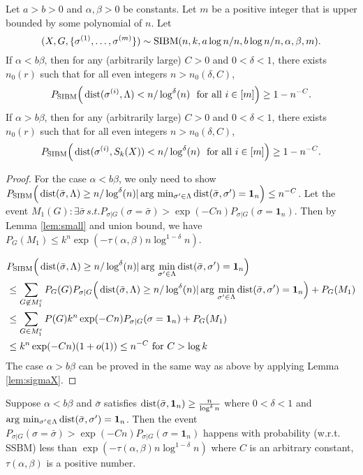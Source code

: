\documentclass{article}
\begin{document}
\begin{proposition} \label{prop:1}
Let $a>b>0$ and $\alpha,\beta>0$ be constants. Let $m$ be a positive integer that is upper bounded by some polynomial of $n$.
Let 
$$
(X,G,\{\sigma^{(1)},\dots,\sigma^{(m)}\})\sim \operatorname{SIBM}(n,k, a\log n/n, b\log n/n, \alpha,\beta, m) .
$$
If $\alpha < b\beta$, then for any (arbitrarily large) $C>0$ and $0<\delta<1$, there exists $n_0(r)$ such that for all even integers $n>n_0(\delta, C)$,
$$
P_{\operatorname{SIBM}} \Big(\operatorname{dist}(\sigma^{(i)}, \Lambda)< n/\log^{\delta}(n)
\text{~~for all~} i\in[m] \Big) \ge 1- n^{-C} .
$$
If $\alpha > b\beta$, then for any (arbitrarily large) $C>0$ and $0<\delta<1$, there exists $n_0(r)$ such that for all even integers $n>n_0(\delta, C)$,
$$
P_{\operatorname{SIBM}} \Big(\operatorname{dist}(\sigma^{(i)}, S_k(X)) < n/\log^{\delta}(n)
\text{~~for all~} i\in[m] \Big) \ge 1- n^{-C} .
$$
\end{proposition}
\begin{proof}
For the case $\alpha < b \beta$, we only need to show $P_{\operatorname{SIBM}} \Big(\operatorname{dist}(\bar{\sigma}, \Lambda)\geq n/\log^{\delta}(n)
| \arg\,\min_{\sigma'\in \Lambda} \operatorname{dist}(\bar{\sigma}, \sigma') = \mathbf{1}_n
 \Big) \leq n^{-C}$.
 Let the event $M_1(G): \exists \bar{\sigma} \,s.t. P_{\sigma | G}(\sigma = \bar{\sigma} ) > \exp(-Cn) P_{\sigma | G}(\sigma = \mathbf{1}_n)$.
Then by Lemma \ref{lem:small} and union bound, we have $P_{G}(M_1) \leq k^n\exp(-\tau(\alpha, \beta )n \log^{1-\delta} n )$.
 
\begin{align*}
&P_{\operatorname{SIBM}} \Big(\operatorname{dist}(\bar{\sigma}, \Lambda)\geq n/\log^{\delta}(n)
| \arg\,\min_{\sigma'\in \Lambda} \operatorname{dist}(\bar{\sigma}, \sigma') = \mathbf{1}_n \Big) \\
&\leq
\sum_{G \not\in M_1^c}P_G(G) P_{\sigma | G}\Big(\operatorname{dist}(\bar{\sigma}, \Lambda)\geq n/\log^{\delta}(n)
| \arg\,\min_{\sigma'\in \Lambda} \operatorname{dist}(\bar{\sigma}, \sigma')= \mathbf{1}_n\Big) + P_G(M_1) \\
&\leq \sum_{G \in M_1^c} P(G) k^n\exp(-Cn)P_{\sigma|G}(\sigma=\mathbf{1}_n) + P_G(M_1) \\
& \leq k^n \exp(-Cn) (1 + o(1)) \leq n^{-C} \textrm{ for } C> \log k
\end{align*}
The case $\alpha > b \beta$ can be proved in the same way as above by applying Lemma \ref{lem:sigmaX}.
\end{proof}
\begin{lemma}\label{lem:small}
	Suppose $\alpha< b \beta$ and $\bar{\sigma}$ satisfies $\operatorname{dist}(\bar{\sigma}, \mathbf{1}_n) \geq \frac{n}{\log^{\delta} n}$
	where $0<\delta < 1$ and $\arg\,\min_{\sigma'\in \Lambda} \operatorname{dist}(\bar{\sigma}, \sigma') = \mathbf{1}_n$. Then the event
	$P_{\sigma | G}(\sigma = \bar{\sigma} ) > \exp(-Cn) P_{\sigma | G}(\sigma = \mathbf{1}_n)$
	happens with probability (w.r.t. SSBM) less than $\exp(-\tau(\alpha,\beta) n \log^{1-\delta} n )$ where $C$ is an arbitrary constant, $\tau(\alpha,\beta)$ is a positive number.
\end{lemma}
\end{document}
